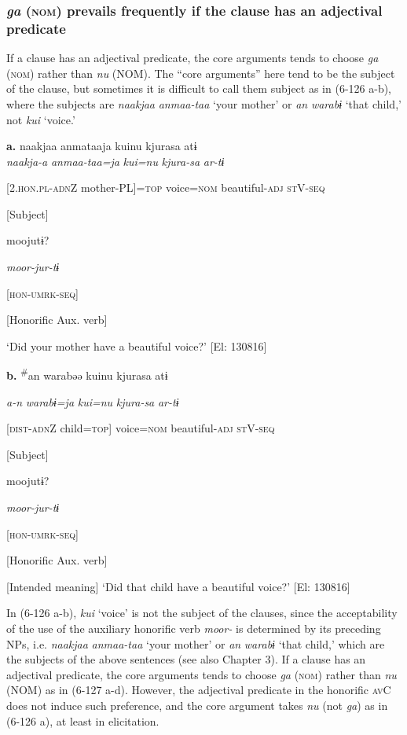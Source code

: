 \subsubsection{\textit{ga} (\textsc{nom}) prevails frequently if the clause has an adjectival predicate}

If a clause has an adjectival predicate, the core arguments tends to choose \textit{ga} (\textsc{nom}) rather than \textit{nu} (NOM). The “core arguments” here tend to be the subject of the clause, but sometimes it is difficult to call them subject as in (6-126 a-b), where the subjects are \textit{naakjaa} \textit{anmaa-taa} ‘your mother’ or \textit{an} \textit{warabɨ} ‘that child,’ not \textit{kui} ‘voice.’

\ea\label{ex:6-126}
 \textbf{a.}  {\TM}  naakjaa  anmataaja  kuinu  kjurasa  atɨ\\

      \textit{naakja-a}  \textit{anmaa-taa=ja}  \textit{kui=nu}  \textit{kjura-sa}  \textit{ar-tɨ}

      [2.\textsc{hon}.\textsc{pl}-\textsc{adn}Z  mother-PL]=\textsc{top}  voice=\textsc{nom}  beautiful-\textsc{adj}  \textsc{st}V-\textsc{seq}

      [Subject]      

      moojutɨ?

      \textit{moor-jur-tɨ}

      [\textsc{hon}-\textsc{umrk}-\textsc{seq}]

      [Honorific Aux. verb]

\glt ‘Did your mother have a beautiful voice?’ [El: 130816]

  \textbf{b.}  {\TM}  \textsuperscript{\#}an  warabəə  kuinu  kjurasa  atɨ

       \textit{a-n}  \textit{warabɨ=ja}  \textit{kui=nu}  \textit{kjura-sa}  \textit{ar-tɨ}

       [\textsc{dist}-\textsc{adn}Z  child=\textsc{top}]  voice=\textsc{nom}  beautiful-\textsc{adj}  \textsc{st}V-\textsc{seq}

       [Subject]      

      moojutɨ?

      \textit{moor-jur-tɨ}

      [\textsc{hon}-\textsc{umrk}-\textsc{seq}]

      [Honorific Aux. verb]

      [Intended meaning] ‘Did that child have a beautiful voice?’ [El: 130816]

In (6-126 a-b), \textit{kui} ‘voice’ is not the subject of the clauses, since the acceptability of the use of the auxiliary honorific verb \textit{moor-} is determined by its preceding NPs, i.e. \textit{naakjaa} \textit{anmaa-taa} ‘your mother’ or \textit{an} \textit{warabɨ} ‘that child,’ which are the subjects of the above sentences (see also Chapter 3). If a clause has an adjectival predicate, the core arguments tends to choose \textit{ga} (\textsc{nom}) rather than \textit{nu} (NOM) as in (6-127 a-d). However, the adjectival predicate in the honorific \textsc{av}C does not induce such preference, and the core argument takes \textit{nu} (not \textit{ga}) as in (6-126 a), at least in elicitation.

